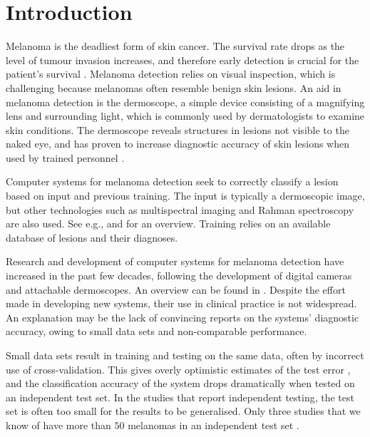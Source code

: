 \documentclass[a4paper,12pt]{article}
\begin{document}
\newpage

\section{Introduction}

Melanoma is the deadliest form of skin cancer. The survival rate drops as the level of tumour invasion increases, and therefore early detection is crucial for the patient's survival \citep{AmericanCancerSociety2016Cancer, CancerRegistryofNorway2016Cancer}. Melanoma detection relies on visual inspection, which is challenging because melanomas often resemble benign skin lesions. 
An aid in melanoma detection is the dermoscope, a simple device consisting of a magnifying lens and surrounding light, which is commonly used by dermatologists to examine skin conditions. 
The dermoscope reveals structures in lesions not visible to the naked eye, and has proven to increase diagnostic accuracy of skin lesions when used by trained personnel \citep{Kittler2002Diagnostic}.

Computer systems for melanoma detection seek to correctly classify a lesion based on input and previous training. 
The input is typically a dermoscopic image, but other technologies such as multispectral imaging and Rahman spectroscopy are also used. 
See e.g., \cite{Fink2016Noninvasive} and \cite{Masood2013Computer} for an overview. 
Training relies on an available database of lesions and their diagnoses. 

Research and development of computer systems for melanoma detection have increased in the past few decades, following the development of digital cameras and attachable dermoscopes. 
An overview can be found in \cite{Korotkov2012Computerized}. 
Despite the effort made in developing new systems, their use in clinical practice is not widespread. 
An explanation may be the lack of convincing reports on the systems' diagnostic accuracy, owing to small data sets and non-comparable performance. 

Small data sets result in training and testing on the same data, often by incorrect use of cross-validation. 
This gives overly optimistic estimates of the test error \citep{Smialowski2010Pitfalls,Hastie2009Elements}, and the classification accuracy of the system drops dramatically when tested on an independent test set. 
In the studies that report independent testing, the test set is often too small for the results to be generalised. 
Only three studies that we know of have more than $50$ melanomas in an independent test set \citep{Monheit2011Performance, Malvehy2014Clinical, Esteva2017Dermatologistlevel}. 
\end{document}
